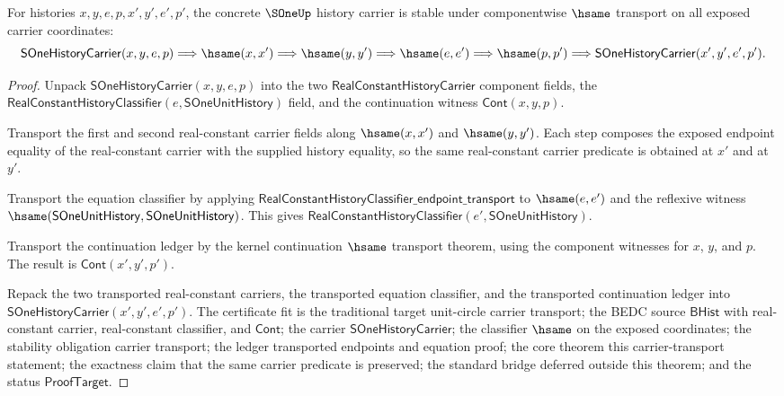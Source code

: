 \begin{theorem}
\label{thm:s1-carrier-hsame-transport}
For histories $x,y,e,p,x',y',e',p'$, the concrete $\SOneUp$ history carrier is
stable under componentwise $\hsame$ transport on all exposed carrier
coordinates:
$$
\mathsf{SOneHistoryCarrier}(x,y,e,p)
\Longrightarrow
\hsame(x,x')
\Longrightarrow
\hsame(y,y')
\Longrightarrow
\hsame(e,e')
\Longrightarrow
\hsame(p,p')
\Longrightarrow
\mathsf{SOneHistoryCarrier}(x',y',e',p').
$$
\end{theorem}
\begin{proof}
Unpack $\mathsf{SOneHistoryCarrier}(x,y,e,p)$ into the two
$\mathsf{RealConstantHistoryCarrier}$ component fields, the
$\mathsf{RealConstantHistoryClassifier}(e,\mathsf{SOneUnitHistory})$ field, and
the continuation witness $\mathsf{Cont}(x,y,p)$.

Transport the first and second real-constant carrier fields along
$\hsame(x,x')$ and $\hsame(y,y')$. Each step composes the exposed endpoint
equality of the real-constant carrier with the supplied history equality, so the
same real-constant carrier predicate is obtained at $x'$ and at $y'$.

Transport the equation classifier by applying
$\mathsf{RealConstantHistoryClassifier\_endpoint\_transport}$ to $\hsame(e,e')$
and the reflexive witness
$\hsame(\mathsf{SOneUnitHistory},\mathsf{SOneUnitHistory})$. This gives
$\mathsf{RealConstantHistoryClassifier}(e',\mathsf{SOneUnitHistory})$.

Transport the continuation ledger by the kernel continuation $\hsame$ transport
theorem, using the component witnesses for $x$, $y$, and $p$. The result is
$\mathsf{Cont}(x',y',p')$.

Repack the two transported real-constant carriers, the transported equation
classifier, and the transported continuation ledger into
$\mathsf{SOneHistoryCarrier}(x',y',e',p')$. The certificate fit is the
traditional target unit-circle carrier transport; the BEDC source
$\mathsf{BHist}$ with real-constant carrier, real-constant classifier, and
$\mathsf{Cont}$; the carrier $\mathsf{SOneHistoryCarrier}$; the classifier
$\hsame$ on the exposed coordinates; the stability obligation carrier
transport; the ledger transported endpoints and equation proof; the core
theorem this carrier-transport statement; the exactness claim that the same
carrier predicate is preserved; the standard bridge deferred outside this
theorem; and the status $\mathsf{ProofTarget}$.
\end{proof}


